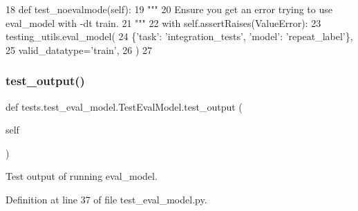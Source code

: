 \begin{DoxyCode}
18     \textcolor{keyword}{def }test\_noevalmode(self):
19         \textcolor{stringliteral}{"""}
20 \textcolor{stringliteral}{        Ensure you get an error trying to use eval\_model with -dt train.}
21 \textcolor{stringliteral}{        """}
22         with self.assertRaises(ValueError):
23             testing\_utils.eval\_model(
24                 \{\textcolor{stringliteral}{'task'}: \textcolor{stringliteral}{'integration\_tests'}, \textcolor{stringliteral}{'model'}: \textcolor{stringliteral}{'repeat\_label'}\},
25                 valid\_datatype=\textcolor{stringliteral}{'train'},
26             )
27 
\end{DoxyCode}
\mbox{\label{classtests_1_1test__eval__model_1_1TestEvalModel_a899d6a41fb8f56be62a7145d9937ee52}} 
\subsubsection{\texorpdfstring{test\+\_\+output()}{test\_output()}}
{\footnotesize\ttfamily def tests.\+test\+\_\+eval\+\_\+model.\+Test\+Eval\+Model.\+test\+\_\+output (\begin{DoxyParamCaption}\item[{}]{self }\end{DoxyParamCaption})}

\begin{DoxyVerb}Test output of running eval_model.
\end{DoxyVerb}
 

Definition at line 37 of file test\+\_\+eval\+\_\+model.\+py.


